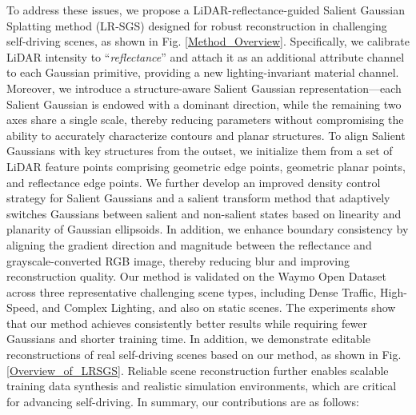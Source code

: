 \documentclass[letterpaper, 10 pt, conference]{ieeeconf}  %
\begin{document}
To address these issues, we propose a LiDAR-reflectance-guided Salient Gaussian Splatting method (LR-SGS) designed for robust reconstruction in challenging self-driving scenes, as shown in Fig. \ref{Method_Overview}. Specifically, we calibrate LiDAR intensity to ``\emph{reflectance}'' and attach it as an additional attribute channel to each Gaussian primitive, providing a new lighting-invariant material channel. Moreover, we introduce a structure-aware Salient Gaussian representation—each Salient Gaussian is endowed with a dominant direction, while the remaining two axes share a single scale, thereby reducing parameters without compromising the ability to accurately characterize contours and planar structures. To align Salient Gaussians with key structures from the outset, we initialize them from a set of LiDAR feature points comprising geometric edge points, geometric planar points, and reflectance edge points. We further develop an improved density control strategy for Salient Gaussians and a salient transform method that adaptively switches Gaussians between salient and non-salient states based on linearity and planarity of Gaussian ellipsoids. In addition, we enhance boundary consistency by aligning the gradient direction and magnitude between the reflectance and grayscale-converted RGB image, thereby reducing blur and improving reconstruction quality. Our method is validated on the Waymo Open Dataset across three representative challenging scene types, including Dense Traffic, High-Speed, and Complex Lighting, and also on static scenes. The experiments show that our method achieves consistently better results while requiring fewer Gaussians and shorter training time. In addition, we demonstrate editable reconstructions of real self-driving scenes based on our method, as shown in Fig. \ref{Overview_of_LRSGS}. Reliable scene reconstruction further enables scalable training data synthesis and realistic simulation environments, which are critical for advancing self-driving. In summary,  our contributions are as follows:
\end{document}
